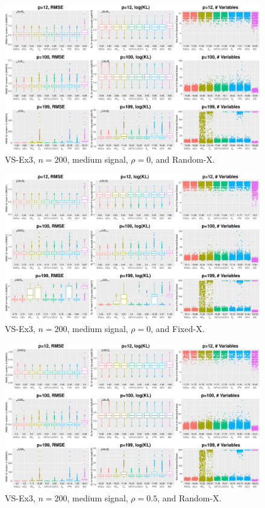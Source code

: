 \clearpage
\begin{figure}[!ht]
\centering
\includegraphics[width=\textwidth]{figures/supplement/randomx_VS-Ex3_n200_msnr_rho0.eps}
\caption{VS-Ex3, $n=200$, medium signal, $\rho=0$, and Random-X.}
\end{figure}
\begin{figure}[!ht]
\centering
\includegraphics[width=\textwidth]{figures/supplement/fixedx_VS-Ex3_n200_msnr_rho0.eps}
\caption{VS-Ex3, $n=200$, medium signal, $\rho=0$, and Fixed-X.}
\end{figure}
\clearpage
\begin{figure}[!ht]
\centering
\includegraphics[width=\textwidth]{figures/supplement/randomx_VS-Ex3_n200_msnr_rho05.eps}
\caption{VS-Ex3, $n=200$, medium signal, $\rho=0.5$, and Random-X.}
\end{figure}

